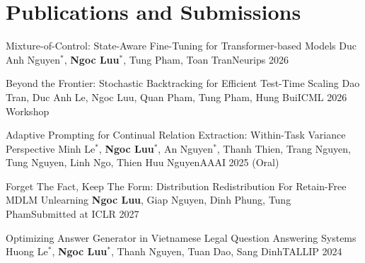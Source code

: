 \section{Publications and Submissions}
\resumeSubHeadingListStart

    \resumeSubheading
    {Mixture-of-Control: State-Aware Fine-Tuning for Transformer-based Models}{}
    {Duc Anh Nguyen$^*$, \textbf{Ngoc Luu}$^*$, Tung Pham, Toan Tran}{Neurips 2026}

    \resumeSubheading
    {Beyond the Frontier: Stochastic Backtracking for Efficient Test-Time Scaling}{}
    {Dao Tran, Duc Anh Le, Ngoc Luu, Quan Pham, Tung Pham, Hung Bui}{ICML 2026 Workshop}
    
    \resumeSubheading
    {Adaptive Prompting for Continual Relation Extraction: Within-Task Variance Perspective}{}
    {Minh Le$^*$, \textbf{Ngoc Luu}$^*$, An Nguyen$^*$, Thanh Thien, Trang Nguyen, Tung Nguyen, Linh Ngo, Thien Huu Nguyen}{AAAI 2025 (Oral)}

    \resumeSubheading
    {Forget The Fact, Keep The Form: Distribution Redistribution For Retain-Free MDLM Unlearning}{}
    {\textbf{Ngoc Luu}, Giap Nguyen, Dinh Phung, Tung Pham}{Submitted at ICLR 2027}

    \resumeSubheading
    {Optimizing Answer Generator in Vietnamese Legal Question Answering Systems}{}
    {Huong Le$^*$, \textbf{Ngoc Luu}$^*$, Thanh Nguyen, Tuan Dao, Sang Dinh}{TALLIP 2024}
    
\resumeSubHeadingListEnd
